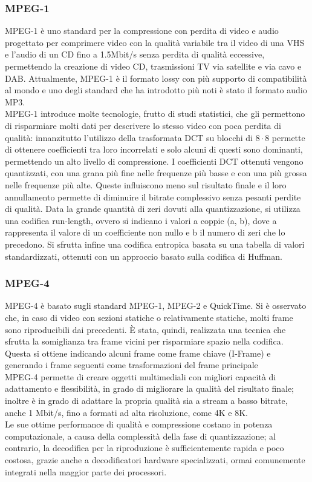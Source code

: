 		\subsubsection{MPEG-1}
			MPEG-1 è uno standard per la compressione con perdita di video e audio progettato per comprimere video con la qualità variabile tra il video di una \gls{VHS} e l'audio di un CD fino a 1.5Mbit/s senza perdita di qualità eccessive, permettendo la creazione di video CD, trasmissioni TV via satellite e via cavo e \gls{DAB}. Attualmente, MPEG-1 è il formato lossy con più supporto di compatibilità al mondo e uno degli standard che ha introdotto più noti è stato il formato audio MP3.
			\\
			MPEG-1 introduce molte tecnologie, frutto di studi statistici, che gli permettono di risparmiare molti dati per descrivere lo stesso video con poca perdita di qualità: innanzitutto l'utilizzo della trasformata DCT su blocchi di \(8\cdot8\) permette di ottenere coefficienti tra loro incorrelati e solo alcuni di questi sono dominanti, permettendo un alto livello di compressione. I coefficienti DCT ottenuti vengono quantizzati, con una grana più fine nelle frequenze più basse e con una più grossa nelle frequenze più alte. Queste influiscono meno sul risultato finale e il loro annullamento permette di diminuire il bitrate complessivo senza pesanti perdite di qualità.
			Data la grande quantità di zeri dovuti alla quantizzazione, si utilizza una codifica run-length, ovvero si indicano i valori a coppie (a, b), dove a rappresenta il valore di un coefficiente non nullo e b il numero di zeri che lo precedono. Si sfrutta infine una codifica entropica basata su una tabella di valori standardizzati, ottenuti con un approccio basato sulla codifica di Huffman.

		\subsubsection{MPEG-4}
			MPEG-4 è basato sugli standard MPEG-1, MPEG-2 e QuickTime. Si è osservato che, in caso di video con sezioni statiche o relativamente statiche, molti frame sono riproducibili dai precedenti. È stata, quindi, realizzata una tecnica che sfrutta la somiglianza tra frame vicini per risparmiare spazio nella codifica. Questa si ottiene indicando alcuni frame come frame chiave (I-Frame) e generando i frame seguenti come trasformazioni del frame principale
			\\
			MPEG-4 permette di creare oggetti multimediali con migliori capacità di adattamento e flessibilità, in grado di migliorare la qualità del risultato finale; inoltre è in grado di adattare la propria qualità sia a stream a basso bitrate, anche 1 Mbit/s, fino a formati ad alta risoluzione, come 4K e 8K.
			\\
			Le sue ottime performance di qualità e compressione costano in potenza computazionale, a causa della complessità della fase di quantizzazione; al contrario, la decodifica per la riproduzione è sufficientemente rapida e poco costosa, grazie anche a decodificatori hardware specializzati, ormai comunemente integrati nella maggior parte dei processori.

